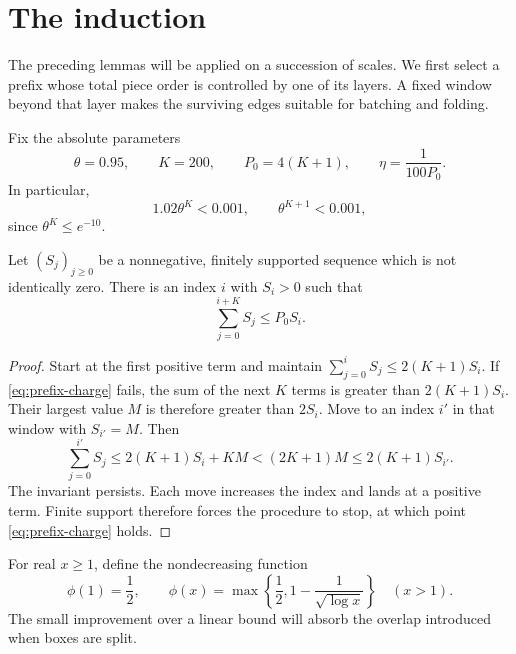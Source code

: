 \section{The induction}\label{sec:induction}

The preceding lemmas will be applied on a succession of scales. We
first select a prefix whose total piece order is controlled by one
of its layers. A fixed window beyond that layer makes the surviving
edges suitable for batching and folding.

Fix the absolute parameters
\begin{equation}\label{eq:induction-parameters}
 \theta=0.95,\qquad K=200,\qquad
 P_0=4(K+1),\qquad \eta=\frac1{100P_0}.
\end{equation}
In particular,
\begin{equation}\label{eq:scale-window}
 1.02\theta^K<0.001,\qquad \theta^{K+1}<0.001,
\end{equation}
since \(\theta^K\le e^{-10}\).

\begin{lemma}\label{lem:prefix-choice}
Let \((S_j)_{j\ge0}\) be a nonnegative, finitely supported sequence
which is not identically zero. There is an index \(i\) with
\(S_i>0\) such that
\begin{equation}\label{eq:prefix-charge}
 \sum_{j=0}^{i+K}S_j\le P_0S_i.
\end{equation}
\end{lemma}

\begin{proof}
Start at the first positive term and maintain
\(\sum_{j=0}^iS_j\le2(K+1)S_i\). If
\eqref{eq:prefix-charge} fails, the sum of the next \(K\) terms
is greater than \(2(K+1)S_i\). Their largest value \(M\) is
therefore greater than \(2S_i\). Move to an index \(i'\) in
that window with \(S_{i'}=M\). Then
\[
 \sum_{j=0}^{i'}S_j
 \le 2(K+1)S_i+KM
 <(2K+1)M\le2(K+1)S_{i'}.
\]
The invariant persists. Each move increases the index and lands
at a positive term. Finite support therefore forces the procedure
to stop, at which point \eqref{eq:prefix-charge} holds.
\end{proof}

For real \(x\ge1\), define the nondecreasing function
\begin{equation}\label{eq:induction-potential}
 \phi(1)=\frac12,\qquad
 \phi(x)=\max\left\{\frac12,
                1-\frac1{\sqrt{\log x}}\right\}
 \quad(x>1).
\end{equation}
The small improvement over a linear bound will absorb the overlap
introduced when boxes are split.

